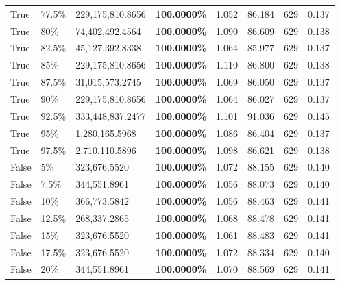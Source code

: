 \begin{table}[H]
\begin{tabular}{lllrllll}
\cline{1-8} \cline{2-8}
True & 77.5\% & 229,175,810.8656 & \bfseries \color{red} 100.0000\% & 1.052 & 86.184 & 629 & 0.137 \\
\cline{1-8} \cline{2-8}
True & 80\% & 74,402,492.4564 & \bfseries \color{red} 100.0000\% & 1.090 & 86.609 & 629 & 0.138 \\
\cline{1-8} \cline{2-8}
True & 82.5\% & 45,127,392.8338 & \bfseries \color{red} 100.0000\% & 1.064 & 85.977 & 629 & 0.137 \\
\cline{1-8} \cline{2-8}
True & 85\% & 229,175,810.8656 & \bfseries \color{red} 100.0000\% & 1.110 & 86.800 & 629 & 0.138 \\
\cline{1-8} \cline{2-8}
True & 87.5\% & 31,015,573.2745 & \bfseries \color{red} 100.0000\% & 1.069 & 86.050 & 629 & 0.137 \\
\cline{1-8} \cline{2-8}
True & 90\% & 229,175,810.8656 & \bfseries \color{red} 100.0000\% & 1.064 & 86.027 & 629 & 0.137 \\
\cline{1-8} \cline{2-8}
True & 92.5\% & 333,448,837.2477 & \bfseries \color{red} 100.0000\% & 1.101 & 91.036 & 629 & 0.145 \\
\cline{1-8} \cline{2-8}
True & 95\% & 1,280,165.5968 & \bfseries \color{red} 100.0000\% & 1.086 & 86.404 & 629 & 0.137 \\
\cline{1-8} \cline{2-8}
True & 97.5\% & 2,710,110.5896 & \bfseries \color{red} 100.0000\% & 1.098 & 86.621 & 629 & 0.138 \\
\cline{1-8} \cline{2-8}
False & 5\% & 323,676.5520 & \bfseries \color{red} 100.0000\% & 1.072 & 88.155 & 629 & 0.140 \\
\cline{1-8} \cline{2-8}
False & 7.5\% & 344,551.8961 & \bfseries \color{red} 100.0000\% & 1.056 & 88.073 & 629 & 0.140 \\
\cline{1-8} \cline{2-8}
False & 10\% & 366,773.5842 & \bfseries \color{red} 100.0000\% & 1.056 & 88.463 & 629 & 0.141 \\
\cline{1-8} \cline{2-8}
False & 12.5\% & \color{red} 268,337.2865 & \bfseries \color{red} 100.0000\% & 1.068 & 88.478 & 629 & 0.141 \\
\cline{1-8} \cline{2-8}
False & 15\% & 323,676.5520 & \bfseries \color{red} 100.0000\% & 1.061 & 88.483 & 629 & 0.141 \\
\cline{1-8} \cline{2-8}
False & 17.5\% & 323,676.5520 & \bfseries \color{red} 100.0000\% & 1.072 & 88.334 & 629 & 0.140 \\
\cline{1-8} \cline{2-8}
False & 20\% & 344,551.8961 & \bfseries \color{red} 100.0000\% & 1.070 & 88.569 & 629 & 0.141 \\

\end{tabular}
\end{table}
